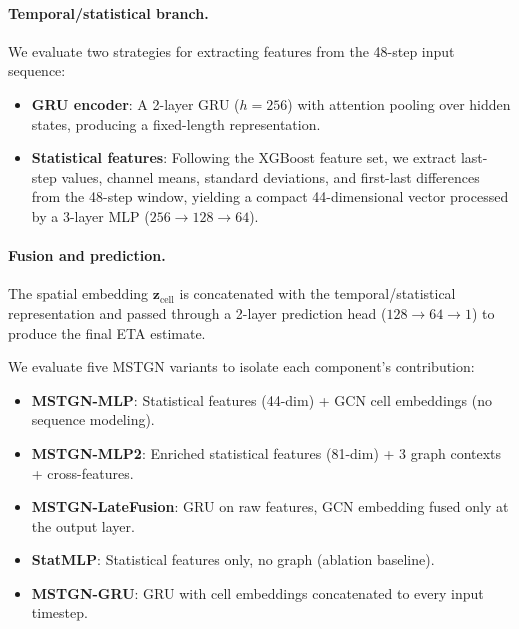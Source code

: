 \documentclass[conference]{IEEEtran}
\begin{document}
\paragraph{Temporal/statistical branch.}
We evaluate two strategies for extracting features from the 48-step input sequence:
\begin{itemize}
    \item \textbf{GRU encoder}: A 2-layer GRU ($h{=}256$) with attention pooling over hidden states, producing a fixed-length representation.
    \item \textbf{Statistical features}: Following the XGBoost feature set, we extract last-step values, channel means, standard deviations, and first-last differences from the 48-step window, yielding a compact 44-dimensional vector processed by a 3-layer MLP ($256{\to}128{\to}64$).
\end{itemize}

\paragraph{Fusion and prediction.}
The spatial embedding $\mathbf{z}_\text{cell}$ is concatenated with the temporal/statistical representation and passed through a 2-layer prediction head ($128{\to}64{\to}1$) to produce the final ETA estimate.

We evaluate five MSTGN variants to isolate each component's contribution:
\begin{itemize}
    \item \textbf{MSTGN-MLP}: Statistical features (44-dim) + GCN cell embeddings (no sequence modeling).
    \item \textbf{MSTGN-MLP2}: Enriched statistical features (81-dim) + 3 graph contexts + cross-features.
    \item \textbf{MSTGN-LateFusion}: GRU on raw features, GCN embedding fused only at the output layer.
    \item \textbf{StatMLP}: Statistical features only, no graph (ablation baseline).
    \item \textbf{MSTGN-GRU}: GRU with cell embeddings concatenated to every input timestep.
\end{itemize}
\end{document}
